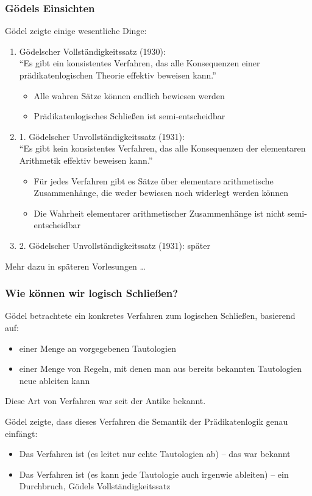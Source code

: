 \documentclass[onlymath]{beamer}
\begin{document}
\begin{frame}\frametitle{Gödels Einsichten}

Gödel zeigte einige wesentliche Dinge:
\begin{enumerate}[(1)]
\item \alert{Gödelscher Vollständigkeitssatz (1930):}\\
"`Es gibt ein konsistentes Verfahren, das alle Konsequenzen einer prädikatenlogischen Theorie
effektiv beweisen kann."'
\begin{itemize}
\item Alle wahren Sätze können endlich bewiesen werden
\item Prädikatenlogisches Schließen ist semi-entscheidbar
\end{itemize}\pause
%
\item \alert{1. Gödelscher Unvollständigkeitssatz (1931):} \\
"`Es gibt kein konsistentes Verfahren, das alle Konsequenzen der elementaren Arithmetik
effektiv beweisen kann."'
\begin{itemize}
\item Für jedes Verfahren gibt es Sätze über elementare arithmetische Zusammenhänge, die weder bewiesen noch
widerlegt werden können
\item Die Wahrheit elementarer arithmetischer Zusammenhänge ist nicht semi-entscheidbar
\end{itemize}\pause
\item \alert{2. Gödelscher Unvollständigkeitssatz (1931):} später
\end{enumerate}

Mehr dazu in späteren Vorlesungen \ldots

\end{frame}


\begin{frame}\frametitle{Wie können wir logisch Schließen?}

Gödel betrachtete ein konkretes Verfahren zum logischen Schließen,
basierend auf:
\begin{itemize}
\item einer Menge an vorgegebenen Tautologien
\item einer Menge von Regeln, mit denen man aus bereits bekannten Tautologien
neue ableiten kann
\end{itemize}
\alert{Diese Art von Verfahren war seit der Antike bekannt.}
\bigskip\pause

Gödel zeigte, dass dieses Verfahren die Semantik der Prädikatenlogik genau
einfängt:
\begin{itemize}
\item Das Verfahren ist  (es leitet nur echte Tautologien ab) -- das war bekannt
\item Das Verfahren ist  (es kann jede Tautologie auch irgenwie ableiten) -- ein Durchbruch, Gödels Vollständigkeitssatz
\end{itemize}

\end{frame}
\end{document}
